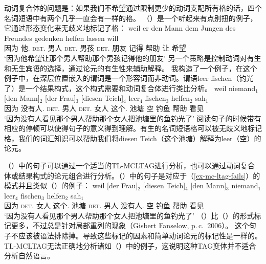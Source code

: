 动词复合体的问题是：如果我们不希望通过限制更少的动词支配所有格的话，四个名词短语中有两个几乎一直会有一样的格。
（）是一个听起来有点别扭的例子，它通过形态变化来无歧义地标记了格：
\ea
\gll weil    er        den        Mann dem        Jungen des Freundes gedenken helfen lassen will\\
     因为 他.\nom{} \textsc{det}.\acc{} 男人  \textsc{det}.\dat{} 男孩    \textsc{det}.\gen{} 朋友 记得 帮助 让 希望 \\
\glt `因为他希望让那个男人帮助那个男孩记得他的朋友' 
\z
另一个策略是控制动词对有生和无生宾语的选择，通过论元的有生性来辅助解释。
我构造了一个例子，在这个例子中，在深层位置嵌入的谓词是一个形容词而非动词。谓语leer fischen（钓光了）是一个结果构式，这个构式需要和动词复合体进行类比分析\citep[\S~5]{Mueller2002b}。
\ea
\gll weil niemand$_1$ [den Mann]$_2$ [der Frau]$_3$ [diesen Teich]$_4$  leer$_4$ fischen$_3$ helfen$_2$ sah$_1$\\
     因为 没有人.\nom{} \spacebr{}\textsc{det}.\acc{} 男人 \spacebr{}\textsc{det}.\dat{} 女人 \spacebr{}这个.\acc{} 池塘 空 钓鱼 帮助 看见 \\
\glt `因为没有人看见那个男人帮助那个女人把池塘里的鱼钓光了' 
\z
阅读句子的时候带有相应的停顿可以使得句子的意义得到理解。有生的名词短语格可以被无歧义地标记格，我们的词汇知识可以帮助我们将diesen Teich（这个池塘）解释为leer（空）的论元。 

（）中的句子可以通过一个适当的TL-MCLTAG进行分析，也可以通过动词复合体或结果构式的论元组合进行分析。（）中的句子是对应于（\ref{ex-mc-ltag-fails}）的模式并且类似（）的例子：
\ea
\gll weil [der Frau]$_2$ [diesen Teich]$_4$ [den Mann]$_3$ niemand$_1$ leer$_4$ fischen$_3$ helfen$_2$ sah$_1$\\
  因为 \spacebr{}\textsc{det}.\dat{} 女人 \spacebr{}这个.\acc{} 池塘 \spacebr{}\textsc{det}.\acc{} 男人 没有人.\nom{} 空 钓鱼 帮助 看见 \\
\glt `因为没有人看见那个男人帮助那个女人把池塘里的鱼钓光了'
\z
（）比（）的形式标记更多，不过总是针对局部重列的现象（Gisbert Fanselow, p.\,c.\ 2006）。
这个句子不应该被语法排除掉。导致这些标记的因素和简单动词论元的标记性是一样的。TL-MCLTAG无法正确地分析诸如（）中的例子，这说明这种TAG变体并不适合分析自然语言。

